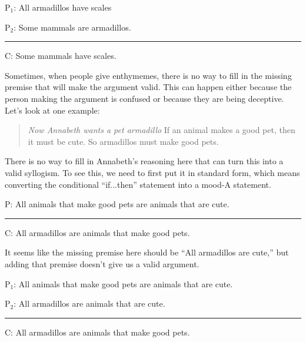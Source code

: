 \begin{earg}
\item[P$_1$:] All armadillos have scales
\item[P$_2$:] Some mammals are armadillos.
\vspace{-.5em}
\item [] \rule{0.3\linewidth}{.5pt} 
\item[C:] Some mammals have scales. 
\end{earg}

Sometimes, when people give enthymemes, there is no way to fill in the missing premise that will make the argument valid. This can happen either because the person making the argument is confused or because they are being deceptive. Let's look at one example: 

\begin{quotation}\noindent\textit{Now Annabeth wants a pet armadillo} If an animal makes a good pet, then it must be cute. So armadillos must make good pets. \end{quotation}

There is no way to fill in Annabeth's reasoning here that can turn this into a valid syllogism. To see this, we need to first put it in standard form, which means converting the conditional ``if...then'' statement into a mood-A statement. 


\begin{earg}
\item[P:] All animals that make good pets are animals that are cute. 
\vspace{-.5em}
\item [] \rule{0.6\linewidth}{.5pt} 
\item[C:] All armadillos are animals that make good pets. 
\end{earg}

It seems like the missing premise here should be ``All armadillos are cute,''  but adding that premise doesn't give us a valid argument. 

\begin{earg}
\item[P$_1$:] All animals that make good pets are animals that are cute.
\item[P$_2$:] All armadillos are animals that are cute. 
\vspace{-.5em}
\item [] \rule{0.6\linewidth}{.5pt} 
\item[C:] All armadillos are animals that make good pets.   
\end{earg}

